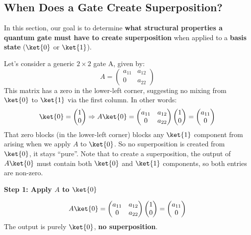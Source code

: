 \subsection{When Does a Gate Create Superposition?}

In this section, our goal is to determine \textbf{what structural properties a quantum gate must have to create superposition} when applied to a \textbf{basis state} ($\ket{0}$ or $\ket{1}$).

\highspace
Let's consider a generic $2 \times 2$ gate A, given by:
\begin{equation*}
    A =
    \begin{pmatrix}
        a_{11} & a_{12} \\ 0 & a_{22}
    \end{pmatrix}
\end{equation*}
This matrix has a zero in the lower-left corner, suggesting no mixing from $\ket{0}$ to $\ket{1}$ via the first column. In other words:
\begin{equation*}
    \ket{0}
    =
    \begin{pmatrix}
        1 \\ 0
    \end{pmatrix}
    \Rightarrow
    A\ket{0}
    =
    \begin{pmatrix}
        a_{11} & a_{12} \\ 0 & a_{22}
    \end{pmatrix}
    \begin{pmatrix}
        1 \\ 0
    \end{pmatrix}
    =
    \begin{pmatrix}
        a_{11} \\ 0
    \end{pmatrix}
\end{equation*}
That zero blocks (in the lower-left corner) blocks any $\ket{1}$ component from arising when we apply $A$ to $\ket{0}$. So no superposition is created from $\ket{0}$, it stays ``pure''. Note that to create a superposition, the output of $A\ket{0}$ must contain both $\ket{0}$ and $\ket{1}$ components, so both entries are non-zero.

\highspace
\begin{flushleft}
    \textcolor{Green3}{\textbf{Step 1: Apply $A$ to $\ket{0}$}}
\end{flushleft}
\begin{equation*}
    A\ket{0}
    =
    \begin{pmatrix}
        a_{11} & a_{12} \\ 0 & a_{22}
    \end{pmatrix}
    \begin{pmatrix}
        1 \\ 0
    \end{pmatrix}
    =
    \begin{pmatrix}
        a_{11} \\ 0
    \end{pmatrix}
\end{equation*}
The output is purely $\ket{0}$, \textbf{no superposition}.

